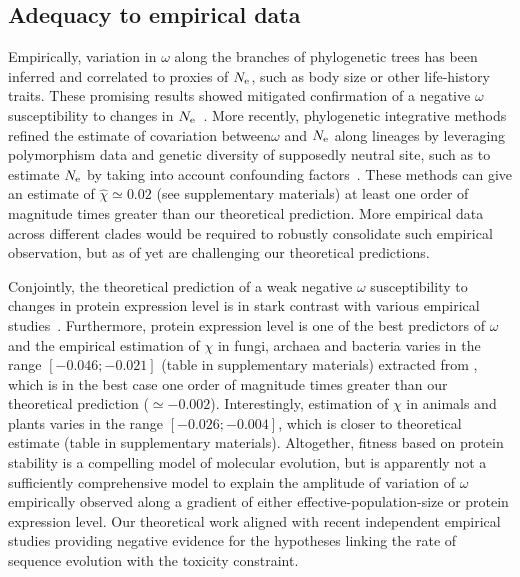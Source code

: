 \subsection{Adequacy to empirical data}
Empirically, variation in $\omega$ along the branches of phylogenetic trees has been inferred and correlated to proxies of $N_{\mathrm{e}}$, such as body size or other life-history traits.
These promising results showed mitigated confirmation of a negative $\omega$ susceptibility to changes in $N_{\mathrm{e}}$~\citep{Lanfear2014}.
More recently, phylogenetic integrative methods refined the estimate of covariation between$\omega$ and $N_{\mathrm{e}}$ along lineages by leveraging polymorphism data and genetic diversity of supposedly \gls{neutral} site, such as to estimate $N_{\mathrm{e}}$ by taking into account confounding factors~\citep{Brevet2019}.
These methods can give an estimate of $\hat{\chi} \simeq 0.02$ (see supplementary materials) at least one order of magnitude times greater than our theoretical prediction.
More empirical data across different clades would be required to robustly consolidate such empirical observation, but as of yet are challenging our theoretical predictions.

Conjointly, the theoretical prediction of a weak negative $\omega$ susceptibility to changes in protein expression level is in stark contrast with various empirical studies~\citep{Duret2000, Rocha2004, Wang2011, Song2017}.
Furthermore, protein expression level is one of the best predictors of $\omega$ and the empirical estimation of $\chi$ in fungi, archaea and bacteria varies in the range $[-0.046;-0.021]$ (table in supplementary materials) extracted from  \citet{Zhang2015}, which is in the best case one order of magnitude times greater than our theoretical prediction ($\simeq -0.002$).
Interestingly, estimation of $\chi$ in animals and plants varies in the range $[-0.026;-0.004]$, which is closer to theoretical estimate (table in supplementary materials). Altogether, fitness based on protein stability is a compelling model of molecular evolution, but is apparently not a sufficiently comprehensive model to explain the amplitude of variation of $\omega$ empirically observed along a gradient of either \gls{effective-population-size} or protein expression level.
Our theoretical work aligned with recent independent empirical studies providing negative evidence for the hypotheses linking the rate of sequence evolution with the toxicity constraint\citep{Plata2017,Razban2019,Biesiadecka2020}.


